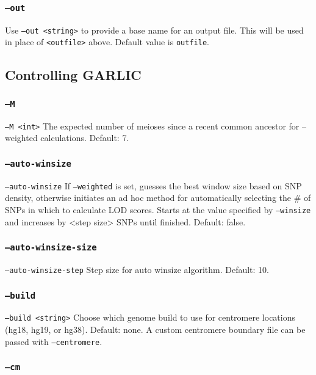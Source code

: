 \documentclass[12pt]{article}%
\begin{document}
\subsubsection{{\tt --out}}

Use {\tt --out <string>} to provide a base name for an output file.  This will be used in place of {\tt <outfile>} above.  Default value is {\tt outfile}.  

\subsection{Controlling GARLIC}

\subsubsection{{\tt --M}}
{\tt --M <int>} The expected number of meioses since a recent common ancestor for --weighted calculations. Default: 7.

\subsubsection{{\tt --auto-winsize}}

{\tt --auto-winsize} If {\tt --weighted} is set, guesses the best window size based on SNP density, otherwise initiates an ad hoc method for automatically selecting the \# of SNPs in which to calculate LOD scores. Starts at the value specified by {\tt --winsize} and increases by <step size> SNPs until finished. Default: false.

\subsubsection{{\tt --auto-winsize-size}}
{\tt --auto-winsize-step} Step size for auto winsize algorithm. Default: 10.

\subsubsection{{\tt --build}}

{\tt --build <string>} Choose which genome build to use for centromere locations (hg18, hg19, or hg38). Default: none. A custom centromere boundary file can be passed with {\tt --centromere}.

\subsubsection{{\tt --cm}}
\end{document}
